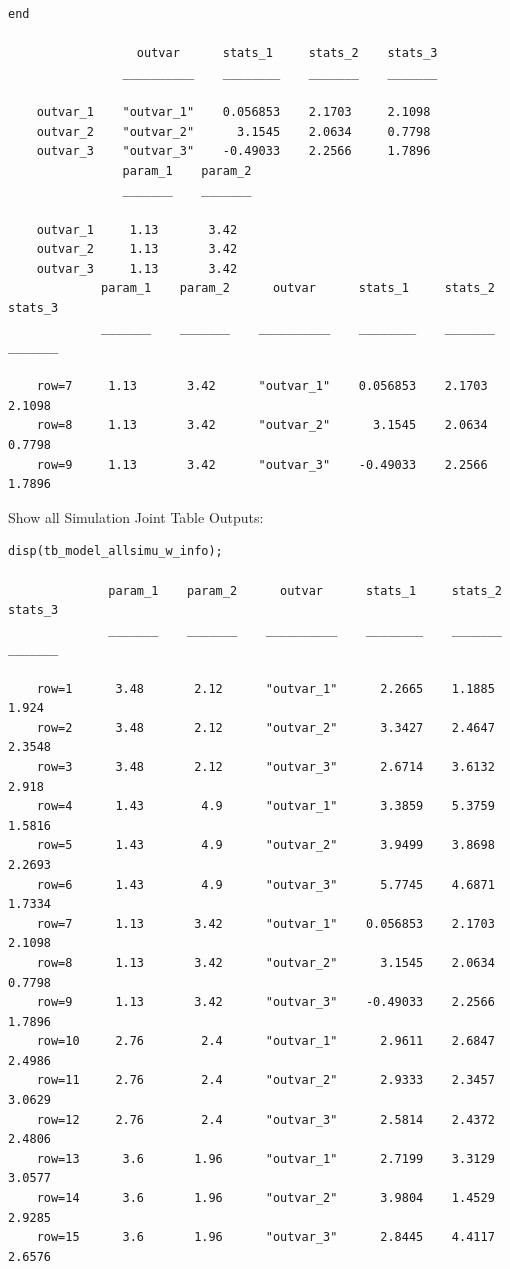 \documentclass[
]{book}
\begin{document}
\begin{verbatim}
end

                  outvar      stats_1     stats_2    stats_3
                __________    ________    _______    _______

    outvar_1    "outvar_1"    0.056853    2.1703     2.1098 
    outvar_2    "outvar_2"      3.1545    2.0634     0.7798 
    outvar_3    "outvar_3"    -0.49033    2.2566     1.7896 
                param_1    param_2
                _______    _______

    outvar_1     1.13       3.42  
    outvar_2     1.13       3.42  
    outvar_3     1.13       3.42  
             param_1    param_2      outvar      stats_1     stats_2    stats_3
             _______    _______    __________    ________    _______    _______

    row=7     1.13       3.42      "outvar_1"    0.056853    2.1703     2.1098 
    row=8     1.13       3.42      "outvar_2"      3.1545    2.0634     0.7798 
    row=9     1.13       3.42      "outvar_3"    -0.49033    2.2566     1.7896 
\end{verbatim}

Show all Simulation Joint Table Outputs:

\begin{verbatim}
disp(tb_model_allsimu_w_info);

              param_1    param_2      outvar      stats_1     stats_2    stats_3
              _______    _______    __________    ________    _______    _______

    row=1      3.48       2.12      "outvar_1"      2.2665    1.1885      1.924 
    row=2      3.48       2.12      "outvar_2"      3.3427    2.4647     2.3548 
    row=3      3.48       2.12      "outvar_3"      2.6714    3.6132      2.918 
    row=4      1.43        4.9      "outvar_1"      3.3859    5.3759     1.5816 
    row=5      1.43        4.9      "outvar_2"      3.9499    3.8698     2.2693 
    row=6      1.43        4.9      "outvar_3"      5.7745    4.6871     1.7334 
    row=7      1.13       3.42      "outvar_1"    0.056853    2.1703     2.1098 
    row=8      1.13       3.42      "outvar_2"      3.1545    2.0634     0.7798 
    row=9      1.13       3.42      "outvar_3"    -0.49033    2.2566     1.7896 
    row=10     2.76        2.4      "outvar_1"      2.9611    2.6847     2.4986 
    row=11     2.76        2.4      "outvar_2"      2.9333    2.3457     3.0629 
    row=12     2.76        2.4      "outvar_3"      2.5814    2.4372     2.4806 
    row=13      3.6       1.96      "outvar_1"      2.7199    3.3129     3.0577 
    row=14      3.6       1.96      "outvar_2"      3.9804    1.4529     2.9285 
    row=15      3.6       1.96      "outvar_3"      2.8445    4.4117     2.6576 
\end{verbatim}
\end{document}

